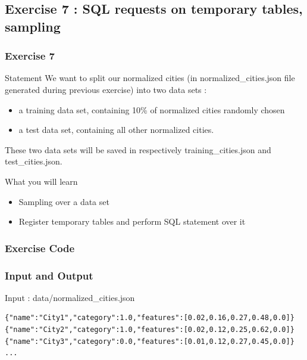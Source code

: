 \documentclass[slidetop,9pt,utf8]{beamer}
\begin{document}
\begin{CJK}{UTF8}{gbsn}
\section{Exercise 7 : SQL requests on temporary tables, sampling}

\begin{frame}
  \frametitle{Exercise 7}

  \begin{block}{Statement}
    We want to split our normalized cities (in normalized\_cities.json file generated during previous exercise) into two data sets : 
    \begin{itemize}
      \item a training data set, containing 10\% of normalized cities randomly chosen
      \item a test data set, containing all other normalized cities. 
    \end{itemize}
    
    These two data sets will be saved in respectively training\_cities.json and test\_cities.json.
  \end{block}

  \begin{block}{What you will learn}
    \begin{itemize}
      \item Sampling over a data set
      \item Register temporary tables and perform SQL statement over it
    \end{itemize}
  \end{block}

\end{frame}

\begin{frame}
  \frametitle{Exercise Code}

  

\end{frame}

\begin{frame}[fragile]

  \frametitle{Input and Output}
  
  \begin{block}{Input : data/normalized\_cities.json}
    \begin{verbatim}
{"name":"City1","category":1.0,"features":[0.02,0.16,0.27,0.48,0.0]}
{"name":"City2","category":1.0,"features":[0.02,0.12,0.25,0.62,0.0]}
{"name":"City3","category":0.0,"features":[0.01,0.12,0.27,0.45,0.0]}
...
    \end{verbatim}
  \end{block}


\end{frame}
\end{CJK}
\end{document}
